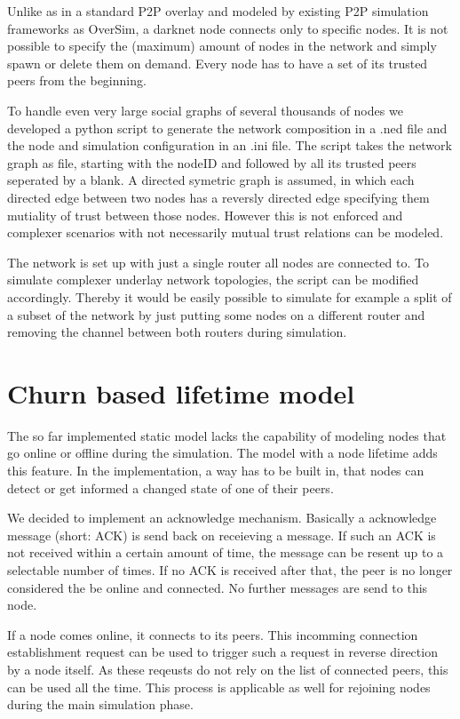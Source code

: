 Unlike as in a standard P2P overlay and modeled by existing P2P simulation frameworks as OverSim, a darknet node connects only to specific nodes. It is not possible to specify the (maximum) amount of nodes in the network and simply spawn or delete them on demand. Every node has to have a set of its trusted peers from the beginning.

To handle even very large social graphs of several thousands of nodes we developed a python script to generate the network composition in a .ned file and the node and simulation configuration in an .ini file. The script takes the network graph as file, starting with the nodeID and followed by all its trusted peers seperated by a blank. A directed symetric graph is assumed, in which each directed edge between two nodes has a reversly directed edge specifying them mutiality of trust between those nodes. However this is not enforced and complexer scenarios with not necessarily mutual trust relations can be modeled.

The network is set up with just a single router all nodes are connected to. To simulate complexer underlay network topologies, the script can be modified accordingly. Thereby it would be easily possible to simulate for example a split of a subset of the network by just putting some nodes on a different router and removing the channel between both routers during simulation.

\section{Churn based lifetime model}

The so far implemented static model lacks the capability of modeling nodes that go online or offline during the simulation. The model with a node lifetime adds this feature. In the implementation, a way has to be built in, that nodes can detect or get informed a changed state of one of their peers.

We decided to implement an acknowledge mechanism. Basically a acknowledge message (short: ACK) is send back on receieving a message. If such an ACK is not received within a certain amount of time, the message can be resent up to a selectable number of times. If no ACK is received after that, the peer is no longer considered the be online and connected. No further messages are send to this node.

If a node comes online, it connects to its peers. This incomming connection establishment request can be used to trigger such a request in reverse direction by a node itself. As these reqeusts do not rely on the list of connected peers, this can be used all the time. This process is applicable as well for rejoining nodes during the main simulation phase.

